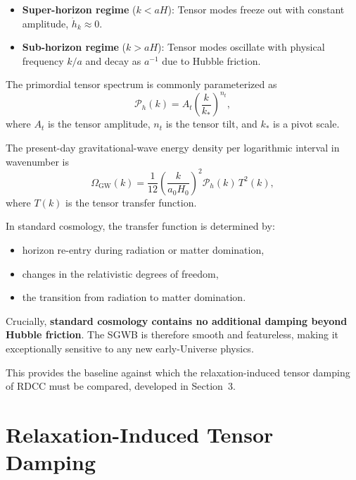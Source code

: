 \documentclass[11pt,a4paper]{article}
\begin{document}
\begin{itemize}
\item \textbf{Super-horizon regime} (\(k < aH\)):  
Tensor modes freeze out with constant amplitude,  
\(\dot{h}_{k} \approx 0\).

\item \textbf{Sub-horizon regime} (\(k > aH\)):  
Tensor modes oscillate with physical frequency \(k/a\) and decay as \(a^{-1}\) due to Hubble friction.
\end{itemize}

The primordial tensor spectrum is commonly parameterized as
\begin{equation}
\mathcal{P}_{h}(k) = A_{t} \left( \frac{k}{k_{*}} \right)^{n_{t}},
\end{equation}
where \(A_{t}\) is the tensor amplitude, \(n_{t}\) is the tensor tilt, and \(k_{*}\) is a pivot scale.

The present-day gravitational-wave energy density per logarithmic interval in wavenumber is
\begin{equation}
\Omega_{\mathrm{GW}}(k)
=
\frac{1}{12}
\left( \frac{k}{a_{0} H_{0}} \right)^{2}
\mathcal{P}_{h}(k)\, T^{2}(k),
\end{equation}
where \(T(k)\) is the tensor transfer function.

In standard cosmology, the transfer function is determined by:

\begin{itemize}
\item horizon re-entry during radiation or matter domination,
\item changes in the relativistic degrees of freedom,
\item the transition from radiation to matter domination.
\end{itemize}

Crucially, \textbf{standard cosmology contains no additional damping beyond Hubble friction}.  
The SGWB is therefore smooth and featureless, making it exceptionally sensitive to any new
early-Universe physics.

This provides the baseline against which the relaxation-induced tensor damping of RDCC must
be compared, developed in Section~3.


\section{Relaxation-Induced Tensor Damping}
\end{document}
